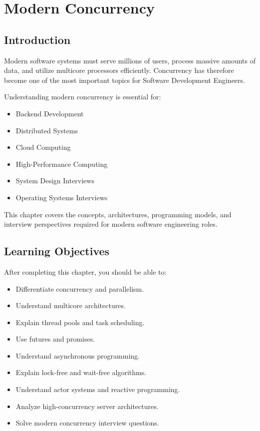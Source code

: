 \chapter{Modern Concurrency}

\section{Introduction}

Modern software systems must serve millions of users, process massive amounts of data, and utilize multicore processors efficiently. Concurrency has therefore become one of the most important topics for Software Development Engineers.

Understanding modern concurrency is essential for:

\begin{itemize}
\item Backend Development
\item Distributed Systems
\item Cloud Computing
\item High-Performance Computing
\item System Design Interviews
\item Operating Systems Interviews
\end{itemize}

This chapter covers the concepts, architectures, programming models, and interview perspectives required for modern software engineering roles.

\section{Learning Objectives}

After completing this chapter, you should be able to:

\begin{itemize}
\item Differentiate concurrency and parallelism.
\item Understand multicore architectures.
\item Explain thread pools and task scheduling.
\item Use futures and promises.
\item Understand asynchronous programming.
\item Explain lock-free and wait-free algorithms.
\item Understand actor systems and reactive programming.
\item Analyze high-concurrency server architectures.
\item Solve modern concurrency interview questions.
\end{itemize}

